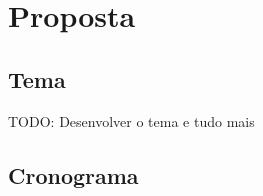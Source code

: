 \chapter{Proposta}
\section{Tema}
\label{pr:theme}
TODO: Desenvolver o tema e tudo mais

\newpage
\section{Cronograma}
\label{pr:chrono}
